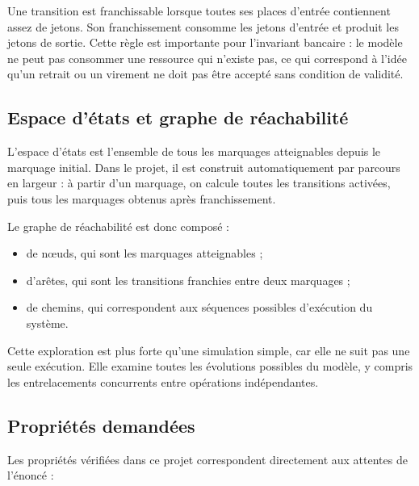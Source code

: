 \documentclass[11pt,a4paper]{article}
\begin{document}
Une transition est franchissable lorsque toutes ses places d'entrée contiennent assez de jetons. Son franchissement consomme les jetons d'entrée et produit les jetons de sortie. Cette règle est importante pour l'invariant bancaire : le modèle ne peut pas consommer une ressource qui n'existe pas, ce qui correspond à l'idée qu'un retrait ou un virement ne doit pas être accepté sans condition de validité.

\subsection{Espace d'états et graphe de réachabilité}

L'espace d'états est l'ensemble de tous les marquages atteignables depuis le marquage initial. Dans le projet, il est construit automatiquement par parcours en largeur : à partir d'un marquage, on calcule toutes les transitions activées, puis tous les marquages obtenus après franchissement.

Le graphe de réachabilité est donc composé :
\begin{itemize}[leftmargin=*]
  \item de nœuds, qui sont les marquages atteignables ;
  \item d'arêtes, qui sont les transitions franchies entre deux marquages ;
  \item de chemins, qui correspondent aux séquences possibles d'exécution du système.
\end{itemize}

Cette exploration est plus forte qu'une simulation simple, car elle ne suit pas une seule exécution. Elle examine toutes les évolutions possibles du modèle, y compris les entrelacements concurrents entre opérations indépendantes.

\subsection{Propriétés demandées}

Les propriétés vérifiées dans ce projet correspondent directement aux attentes de l'énoncé :
\end{document}
